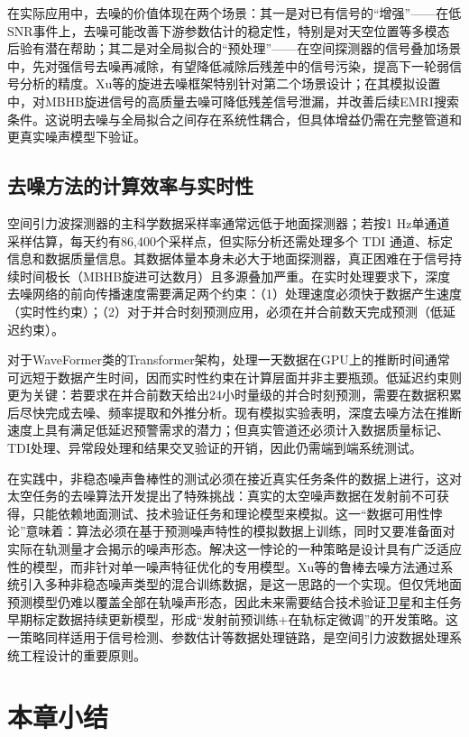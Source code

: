 在实际应用中，去噪的价值体现在两个场景：其一是对已有信号的“增强”——在低SNR事件上，去噪可能改善下游参数估计的稳定性，特别是对天空位置等多模态后验有潜在帮助；其二是对全局拟合的“预处理”——在空间探测器的信号叠加场景中，先对强信号去噪再减除，有望降低减除后残差中的信号污染，提高下一轮弱信号分析的精度。Xu等的旋进去噪框架特别针对第二个场景设计；在其模拟设置中，对MBHB旋进信号的高质量去噪可降低残差信号泄漏，并改善后续EMRI搜索条件。这说明去噪与全局拟合之间存在系统性耦合，但具体增益仍需在完整管道和更真实噪声模型下验证。

\subsection{去噪方法的计算效率与实时性}

空间引力波探测器的主科学数据采样率通常远低于地面探测器；若按1 Hz单通道采样估算，每天约有86,400个采样点，但实际分析还需处理多个 TDI 通道、标定信息和数据质量信息。其数据体量本身未必大于地面探测器，真正困难在于信号持续时间极长（MBHB旋进可达数月）且多源叠加严重。在实时处理要求下，深度去噪网络的前向传播速度需要满足两个约束：（1）处理速度必须快于数据产生速度（实时性约束）；（2）对于并合时刻预测应用，必须在并合前数天完成预测（低延迟约束）。

对于WaveFormer类的Transformer架构，处理一天数据在GPU上的推断时间通常可远短于数据产生时间，因而实时性约束在计算层面并非主要瓶颈。低延迟约束则更为关键：若要求在并合前数天给出24小时量级的并合时刻预测，需要在数据积累后尽快完成去噪、频率提取和外推分析。现有模拟实验表明，深度去噪方法在推断速度上具有满足低延迟预警需求的潜力；但真实管道还必须计入数据质量标记、TDI处理、异常段处理和结果交叉验证的开销，因此仍需端到端系统测试。

在实践中，非稳态噪声鲁棒性的测试必须在接近真实任务条件的数据上进行，这对太空任务的去噪算法开发提出了特殊挑战：真实的太空噪声数据在发射前不可获得，只能依赖地面测试、技术验证任务和理论模型来模拟。这一“数据可用性悖论”意味着：算法必须在基于预测噪声特性的模拟数据上训练，同时又要准备面对实际在轨测量才会揭示的噪声形态。解决这一悖论的一种策略是设计具有广泛适应性的模型，而非针对单一噪声特征优化的专用模型。Xu等的鲁棒去噪方法通过系统引入多种非稳态噪声类型的混合训练数据，是这一思路的一个实现。但仅凭地面预测模型仍难以覆盖全部在轨噪声形态，因此未来需要结合技术验证卫星和主任务早期标定数据持续更新模型，形成“发射前预训练+在轨标定微调”的开发策略。这一策略同样适用于信号检测、参数估计等数据处理链路，是空间引力波数据处理系统工程设计的重要原则。

\section{本章小结}

